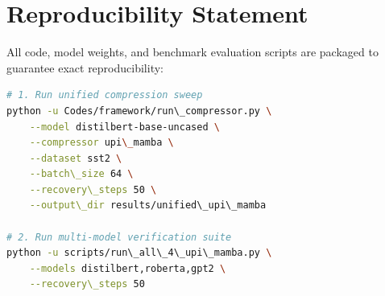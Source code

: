 \section{Reproducibility Statement}
All code, model weights, and benchmark evaluation scripts are packaged to guarantee exact reproducibility:
\begin{lstlisting}[language=bash]
# 1. Run unified compression sweep
python -u Codes/framework/run\_compressor.py \
    --model distilbert-base-uncased \
    --compressor upi\_mamba \
    --dataset sst2 \
    --batch\_size 64 \
    --recovery\_steps 50 \
    --output\_dir results/unified\_upi\_mamba

# 2. Run multi-model verification suite
python -u scripts/run\_all\_4\_upi\_mamba.py \
    --models distilbert,roberta,gpt2 \
    --recovery\_steps 50
\end{lstlisting}
